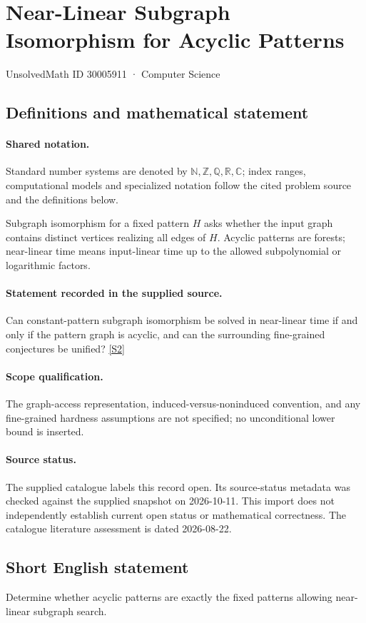 \documentclass[11pt]{article}
\newcommand{\sref}[2]{\hyperlink{source:#1:#2}{[S#2]}}
\begin{document}
\setcounter{section}{30005910}
\section{Near-Linear Subgraph Isomorphism for Acyclic Patterns}\label{30005911}
{\small\sffamily UnsolvedMath ID 30005911 · Computer Science}
\subsection{Definitions and mathematical statement}

\paragraph{Shared notation.}Standard number systems are denoted by $\mathbb N,\mathbb Z,\mathbb Q,\mathbb R,\mathbb C$; index ranges, computational models and specialized notation follow the cited problem source and the definitions below.


Subgraph isomorphism for a fixed pattern $H$ asks whether the input graph contains distinct vertices realizing all edges of $H$. Acyclic patterns are forests; near-linear time means input-linear time up to the allowed subpolynomial or logarithmic factors.
\paragraph{Statement recorded in the supplied source.}
Can constant-pattern subgraph isomorphism be solved in near-linear time if and only if the pattern graph is acyclic, and can the surrounding fine-grained conjectures be unified? \sref{30005911}{2}
\paragraph{Scope qualification.}
The graph-access representation, induced-versus-noninduced convention, and any fine-grained hardness assumptions are not specified; no unconditional lower bound is inserted.
\paragraph{Source status.}
The supplied catalogue labels this record open. Its source-status metadata was checked against the supplied snapshot on 2026-10-11. This import does not independently establish current open status or mathematical correctness. The catalogue literature assessment is dated 2026-08-22.
\subsection{Short English statement}
Determine whether acyclic patterns are exactly the fixed patterns allowing near-linear subgraph search.
\end{document}
